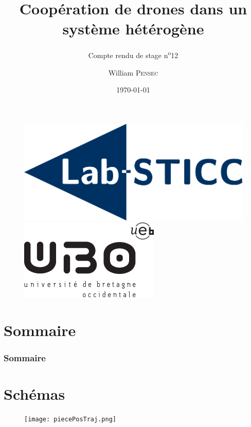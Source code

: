 \documentclass[12pt]{beamer}
\title[Compte rendu de stage n\textsuperscript{o}12]{Coopération de drones dans un système hétérogène}
\subtitle{Compte rendu de stage n\textsuperscript{o}12}
\author{William \textsc{Pensec}}
\institute[Lab-STICC]{Lab-Sticc}
\date{\today}
\begin{document}
	\begin{frame}
		\begin{titlepage}
			\begin{figure}[H]
				\centering
				\includegraphics[scale=.15]{labsticc.png}
				\hspace{3cm}
				\includegraphics[scale=.3]{ubo.png}
			\end{figure}
		\end{titlepage}
	\end{frame}
	
	\section*{Sommaire}
	\begin{frame}
		\frametitle{Sommaire}
		\begin{center}
			\tableofcontents
		\end{center}
	\end{frame}
	\section{Schémas}
	\begin{frame}
    	    \begin{figure}
			    \centering
			    \texttt{[image: piecePosTraj.png]}
			\end{figure}
	\end{frame}
\end{document}
